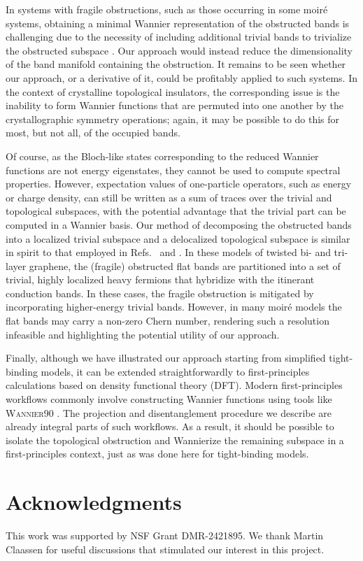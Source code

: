 \documentclass[galley,aps,pra,10pt,amsmath,amssymb,
    superscriptaddress,nofootinbib,longbibliography]{revtex4-2}
\newcounter{comm}
\begin{document}
In systems with fragile obstructions, such as those occurring in some moir\'e systems, obtaining a minimal Wannier representation of the obstructed bands is challenging due to the necessity of including additional trivial bands to trivialize the obstructed subspace \cite{po2019}. Our approach would instead reduce the dimensionality of the band manifold containing the obstruction. It remains to be seen whether our approach, or a derivative of it, could be profitably applied to such systems. In the context of crystalline topological insulators, the corresponding issue is the inability to form Wannier functions that are permuted into one another by the crystallographic symmetry operations; again, it may be possible to do this for most, but not all, of the occupied bands.

Of course, as the Bloch-like states corresponding to the reduced Wannier functions are not energy eigenstates, they cannot be used to compute spectral properties. However, expectation values of one-particle operators, such as energy or charge density, can still be written as a sum of traces over the trivial and topological subspaces, with the potential advantage that the trivial part can be computed in a Wannier basis. Our method of decomposing the obstructed bands into a localized trivial subspace and a delocalized topological subspace is similar in spirit to that employed in Refs.~\cite{song2022} and \cite{yu2023}. In these models of twisted bi- and tri-layer graphene, the (fragile) obstructed flat bands are partitioned into a set of trivial, highly localized heavy fermions that hybridize with the itinerant conduction bands. In these cases, the fragile obstruction is mitigated by incorporating higher-energy trivial bands. However, in many moiré models the flat bands may carry a non-zero Chern number, rendering such a resolution infeasible and highlighting the potential utility of our approach.


Finally, although we have illustrated our approach starting from simplified tight-binding models, it can be extended straightforwardly to first-principles calculations based on density functional theory (DFT). Modern first-principles workflows commonly involve constructing Wannier functions using tools like \textsc{Wannier90} \cite{MOSTOFI20142309, Marrazzo2023TheWS}. The projection and disentanglement procedure we describe are already integral parts of such workflows. As a result, it should be possible to isolate the topological obstruction and Wannierize the remaining subspace in a first-principles context, just as was done here for tight-binding models. 


 \section*{Acknowledgments}

This work was supported by NSF Grant DMR-2421895. We thank Martin Claassen for useful discussions that stimulated our interest in this project.

\newpage

\end{document}
